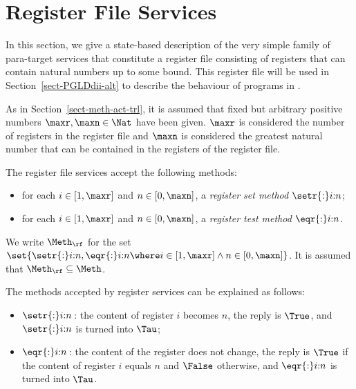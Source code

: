 \documentclass[fleqn]{llncs}
\begin{document}
\section{Register File Services}
\label{sect-reg}

In this section, we give a state-based description of the very simple
family of para-target services that constitute a register file
consisting of registers that can contain natural numbers up to some
bound.
This register file will be used in Section~\ref{sect-PGLDdii-alt} to
describe the behaviour of programs in \PGLDdii.

As in Section~\ref{sect-meth-act-trl}, it is assumed that fixed but
arbitrary positive numbers $\maxr,\maxn \in \Nat$ have been given.
$\maxr$ is considered the number of registers in the register file and
$\maxn$ is considered the greatest natural number that can be contained
in the registers of the register file.

The register file services accept the following methods:
\begin{itemize}
\item
for each $i \in [1,\maxr]$ and $n \in [0,\maxn]$,
a \emph{register set method} $\setr{:}i{:}n$;
\item
for each $i \in [1,\maxr]$ and $n \in [0,\maxn]$,
a \emph{register test method} $\eqr{:}i{:}n$.
\end{itemize}
We write $\Meth_\rf$ for the set
$\set{\setr{:}i{:}n,\eqr{:}i{:}n \where
      i \in [1,\maxr] \land n \in [0,\maxn]}$.
It is assumed that $\Meth_\rf \subseteq \Meth$.

The methods accepted by register services can be explained as follows:
\begin{itemize}
\item
$\setr{:}i{:}n$\,:
the content of register $i$ becomes $n$, the reply is $\True$, and
$\setr{:}i{:}n$ is turned into $\Tau$;
\item
$\eqr{:}i{:}n$\,:
the content of the register does not change, the reply is $\True$ if the
content of register $i$ equals $n$ and $\False$ otherwise, and
$\eqr{:}i{:}n$ is turned into $\Tau$.
\end{itemize}
\end{document}
